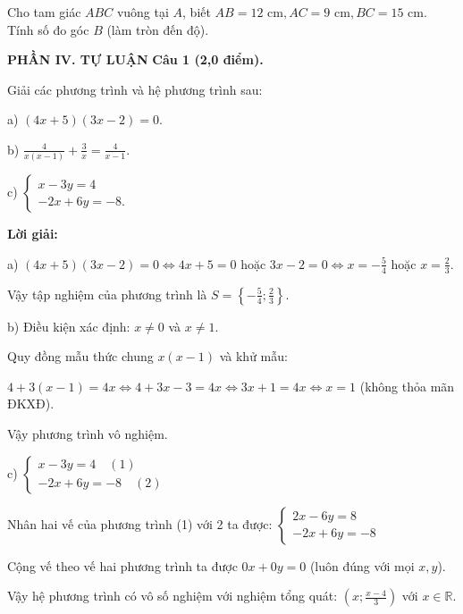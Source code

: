\documentclass[12pt,a4paper]{article}
\begin{document}
\begin{ex}
Cho tam giác $ABC$ vuông tại $A$, biết $AB = 12\text{ cm}, AC = 9\text{ cm}, BC = 15\text{ cm}$. Tính số đo góc $B$ (làm tròn đến độ).
\end{ex}


\newpage
\noindent\textbf{\large PHẦN IV. TỰ LUẬN}
\vspace{1mm}
\noindent\textbf{Câu 1 (2,0 điểm).}

Giải các phương trình và hệ phương trình sau:\par a) $(4x + 5)(3x - 2) = 0$.\par b) $\frac{4}{x(x - 1)} + \frac{3}{x} = \frac{4}{x - 1}$.\par c) $\begin{cases} x - 3y = 4 \\ -2x + 6y = -8. \end{cases}$

\noindent\textbf{Lời giải:}

a) $(4x + 5)(3x - 2) = 0 \iff 4x + 5 = 0$ hoặc $3x - 2 = 0 \iff x = -\frac{5}{4}$ hoặc $x = \frac{2}{3}$.\par Vậy tập nghiệm của phương trình là $S = \left\{-\frac{5}{4}; \frac{2}{3}\right\}$.\par b) Điều kiện xác định: $x \neq 0$ và $x \neq 1$.\par Quy đồng mẫu thức chung $x(x - 1)$ và khử mẫu:\par $4 + 3(x - 1) = 4x \iff 4 + 3x - 3 = 4x \iff 3x + 1 = 4x \iff x = 1$ (không thỏa mãn ĐKXĐ).\par Vậy phương trình vô nghiệm.\par c) $\begin{cases} x - 3y = 4 \quad (1) \\ -2x + 6y = -8 \quad (2) \end{cases}$\par Nhân hai vế của phương trình (1) với 2 ta được: $\begin{cases} 2x - 6y = 8 \\ -2x + 6y = -8 \end{cases}$\par Cộng vế theo vế hai phương trình ta được $0x + 0y = 0$ (luôn đúng với mọi $x, y$).\par Vậy hệ phương trình có vô số nghiệm với nghiệm tổng quát: $\left(x; \frac{x - 4}{3}\right)$ với $x \in \mathbb{R}$.
\end{document}
